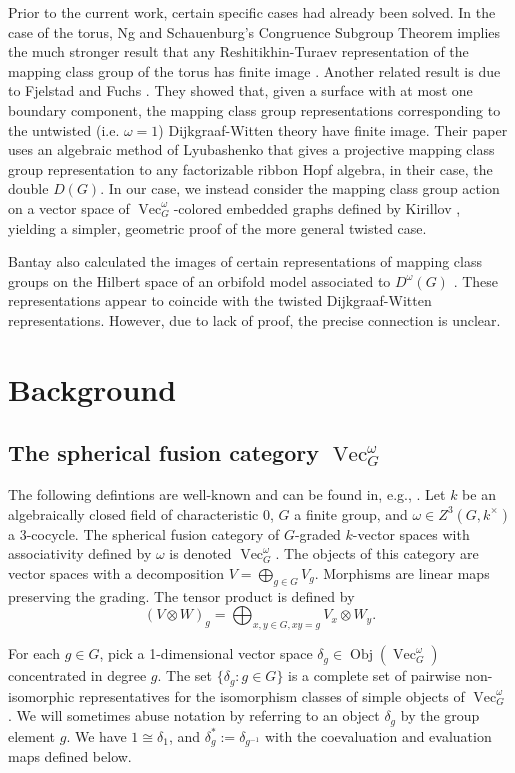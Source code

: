 \documentclass{ws-jktr}
\DeclareMathOperator{\Vect}{Vec}
\DeclareMathOperator{\Obj}{Obj}
\newcommand{\one}{1}
\begin{document}
Prior to the current work, certain specific cases had already been solved. In the case of the torus, Ng and Schauenburg's Congruence Subgroup Theorem implies the much stronger result that any Reshitikhin-Turaev representation of the mapping class group of the torus has finite image \cite{0806.2493}.   Another related result is due to Fjelstad and Fuchs \cite{fjfu}.  They showed that, given a surface with at most one boundary component, the mapping class group representations corresponding to the untwisted (i.e. $\omega = 1$) Dijkgraaf-Witten theory have finite image.  Their paper uses an algebraic method of Lyubashenko \cite{Lyubashenko1996} that gives a projective mapping class group representation to any factorizable ribbon Hopf algebra, in their case, the double $D(G)$. In our case, we instead consider the mapping class group action on a vector space of $\Vect_G^\omega$-colored embedded graphs defined by Kirillov \cite{kirillovStringNets}, yielding a simpler, geometric proof of the more general twisted case.

Bantay also calculated the images of certain representations of mapping class groups on the Hilbert space of an orbifold model associated to $D^\omega(G)$ \cite{bantay}.  These representations appear to coincide with the twisted Dijkgraaf-Witten representations. However, due to lack of proof, the precise connection is unclear. 


\section{Background}
\subsection{The spherical fusion category $\Vect_G^\omega$}
The following defintions are well-known and can be found in, e.g., \cite{etingofTensor}.  Let $k$ be an  algebraically closed field of characteristic 0,  $G$ a finite group, and $\omega \in Z^3(G, k^\times)$ a 3-cocycle.    The spherical fusion category of $G$-graded $k$-vector spaces with associativity defined by $\omega$ is denoted $\Vect_G^\omega$.  The objects of this category are vector spaces with a decomposition $V = \bigoplus_{g \in G} V_g$. Morphisms are linear maps preserving the grading. The tensor product is defined by
$$ (V \otimes W)_g = \bigoplus_{x,y \in G, xy = g} V_x \otimes W_y. $$

For each $g \in G$, pick a 1-dimensional vector space $\delta_g \in \Obj(\Vect_G^\omega)$ concentrated in degree $g$.  The set $\{\delta_g : g \in G\}$ is a complete set of pairwise non-isomorphic representatives for the isomorphism classes of simple objects of $\Vect_G^\omega$.  We will sometimes abuse notation by referring to an object $\delta_g$ by the group element $g$.  We have $\one \cong \delta_1$, and  $\delta_g^* := \delta_{g^{-1}}$ with the coevaluation and evaluation maps defined below.
\end{document}
